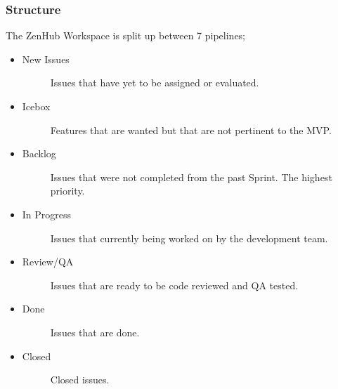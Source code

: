 \documentclass[letterpaper,10pt,english]{sphinxmanual}
\begin{document}
\subsubsection{Structure}
\label{\detokenize{test_plan/issue_management:structure}}
The ZenHub Workspace is split up between 7 pipelines;
\begin{itemize}
\item {} \begin{description}
\item[{New Issues}] \leavevmode
Issues that have yet to be assigned or evaluated.

\end{description}

\item {} \begin{description}
\item[{Icebox}] \leavevmode
Features that are wanted but that are not pertinent to the MVP.

\end{description}

\item {} \begin{description}
\item[{Backlog}] \leavevmode
Issues that were not completed from the past Sprint. The highest priority.

\end{description}

\item {} \begin{description}
\item[{In Progress}] \leavevmode
Issues that currently being worked on by the development team.

\end{description}

\item {} \begin{description}
\item[{Review/QA}] \leavevmode
Issues that are ready to be code reviewed and QA tested.

\end{description}

\item {} \begin{description}
\item[{Done}] \leavevmode
Issues that are done.

\end{description}

\item {} \begin{description}
\item[{Closed}] \leavevmode
Closed issues.

\end{description}

\end{itemize}
\end{document}
